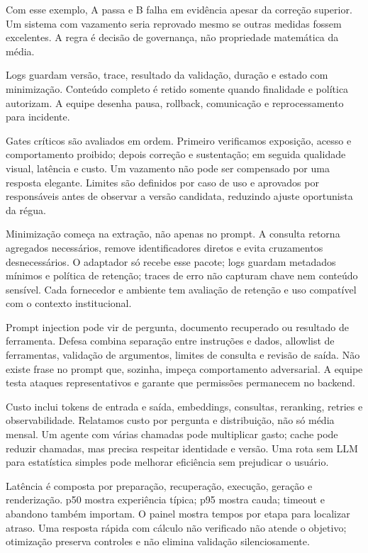 Com esse exemplo, A passa e B falha em evidência apesar da correção superior. Um sistema com vazamento seria reprovado mesmo se outras medidas fossem excelentes. A regra é decisão de governança, não propriedade matemática da média.

Logs guardam versão, trace, resultado da validação, duração e estado com minimização. Conteúdo completo é retido somente quando finalidade e política autorizam. A equipe desenha pausa, rollback, comunicação e reprocessamento para incidente.

Gates críticos são avaliados em ordem. Primeiro verificamos exposição, acesso e comportamento proibido; depois correção e sustentação; em seguida qualidade visual, latência e custo. Um vazamento não pode ser compensado por uma resposta elegante. Limites são definidos por caso de uso e aprovados por responsáveis antes de observar a versão candidata, reduzindo ajuste oportunista da régua.

Minimização começa na extração, não apenas no prompt. A consulta retorna agregados necessários, remove identificadores diretos e evita cruzamentos desnecessários. O adaptador só recebe esse pacote; logs guardam metadados mínimos e política de retenção; traces de erro não capturam chave nem conteúdo sensível. Cada fornecedor e ambiente tem avaliação de retenção e uso compatível com o contexto institucional.

Prompt injection pode vir de pergunta, documento recuperado ou resultado de ferramenta. Defesa combina separação entre instruções e dados, allowlist de ferramentas, validação de argumentos, limites de consulta e revisão de saída. Não existe frase no prompt que, sozinha, impeça comportamento adversarial. A equipe testa ataques representativos e garante que permissões permanecem no backend.

Custo inclui tokens de entrada e saída, embeddings, consultas, reranking, retries e observabilidade. Relatamos custo por pergunta e distribuição, não só média mensal. Um agente com várias chamadas pode multiplicar gasto; cache pode reduzir chamadas, mas precisa respeitar identidade e versão. Uma rota sem LLM para estatística simples pode melhorar eficiência sem prejudicar o usuário.

Latência é composta por preparação, recuperação, execução, geração e renderização. p50 mostra experiência típica; p95 mostra cauda; timeout e abandono também importam. O painel mostra tempos por etapa para localizar atraso. Uma resposta rápida com cálculo não verificado não atende o objetivo; otimização preserva controles e não elimina validação silenciosamente.


